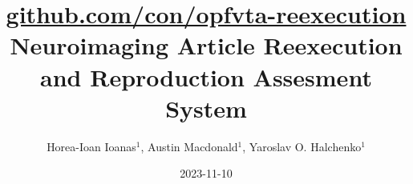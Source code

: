 

\date{2023-11-10}
\title{
	\href{https://github.com/con/opfvta-reexecution}{
		\Large github.com/con/opfvta-reexecution
	}\\\vspace{.15em}
	Neuroimaging Article Reexecution and Reproduction Assesment System
}
\author{
	Horea-Ioan Ioanas$^{1}$,
	Austin Macdonald$^{1}$,
	Yaroslav O. Halchenko$^{1}$
}

\newcommand{\myDOI}{10.5281/zenodo.10085170}
\newcommand{\myemail}{horea@dartmouth.edu}



